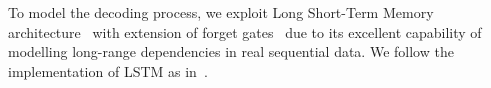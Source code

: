 \documentclass[10pt,twocolumn,letterpaper]{article}
\begin{document}
	To model the decoding process, we exploit Long Short-Term Memory architecture~\cite{hochreiter1997long} with extension of forget gates~\cite{gers2000learning} due to its excellent capability of modelling long-range dependencies in real sequential data. We follow the implementation of LSTM as in~\cite{zaremba2014recurrent}.
	
\end{document}
